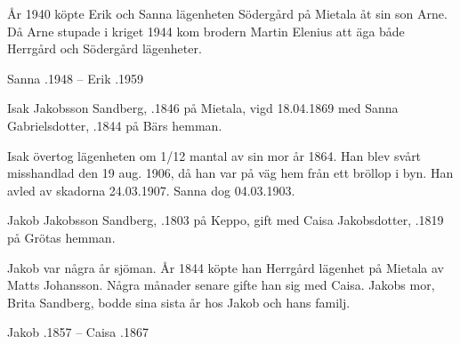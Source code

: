 År 1940 köpte Erik och Sanna lägenheten Södergård på Mietala åt sin son Arne. Då Arne stupade i kriget 1944 kom brodern Martin Elenius att äga både Herrgård och Södergård lägenheter.

Sanna .1948  --  Erik .1959


Isak Jakobsson Sandberg, .1846 på Mietala, vigd 18.04.1869 med Sanna Gabrielsdotter, .1844 på Bärs hemman.
\begin{jhchildren}
  \item {}
  \item {}
  \item {}
  \item {}
  \item {}
  \item {}
  \item {}
\end{jhchildren}
Isak övertog lägenheten om 1/12 mantal av sin mor år 1864. Han blev svårt misshandlad den 19 aug. 1906, då han var på väg hem från ett bröllop i byn. Han avled av skadorna 24.03.1907. Sanna dog 04.03.1903.


Jakob Jakobsson Sandberg, .1803 på Keppo, gift med Caisa Jakobsdotter, .1819 på Grötas hemman.
\begin{jhchildren}
  \item {}
  \item {}
  \item {}
  \item {}
  \item {}
  \item {}
\end{jhchildren}
Jakob var några år sjöman. År 1844 köpte han Herrgård lägenhet på Mietala av Matts Johansson. Några månader senare gifte han sig med Caisa. Jakobs mor, Brita Sandberg, bodde sina sista år hos Jakob och hans familj.

Jakob .1857  --  Caisa .1867


